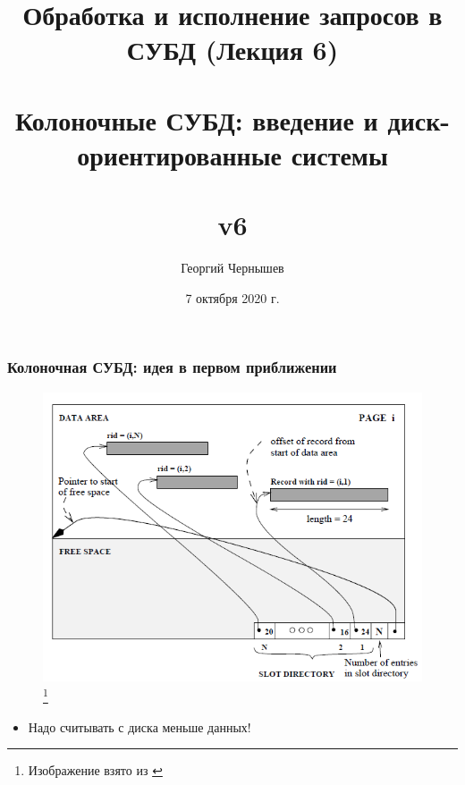 \documentclass{beamer}
\title[Обработка и исполнение запросов: лекция 6]{Обработка и исполнение запросов в СУБД (Лекция 6) \\~\\ Колоночные СУБД: введение и диск-ориентированные системы\\~\\ v6} %
\author{Георгий Чернышев} %
\institute[ВШЭ] %
{
Высшая Школа Экономики \\ %
\medskip
\textit{chernishev@gmail.com} %
}
\date{7 октября 2020 г.}
\begin{document}
\begin{frame}
\titlepage %
\end{frame}

\begin{frame}
\frametitle{Колоночная СУБД: идея в первом приближении}

\begin{figure}[htb]
\includegraphics[width=\textwidth,height=0.70\textheight,keepaspectratio]{slotted.png} 
\footnote{\tiny{Изображение взято из \cite{Ramakrishnan2000}}}
 \end{figure}    

\begin{itemize}
  \setlength\itemsep{1em}
  \item Надо считывать с диска меньше данных!
\end{itemize}

\end{frame}
\end{document}
